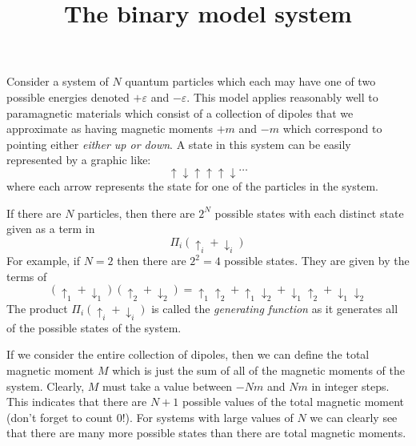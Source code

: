\documentclass{article}
\title{The binary model system}
\begin{document}
\maketitle
Consider a system of $N$ quantum particles which each may have one of two
possible energies denoted $+\varepsilon$ and $-\varepsilon$. This model applies
reasonably well to paramagnetic materials which consist of a collection of
dipoles that we approximate as having magnetic moments $+m$ and $-m$ which
correspond to pointing either \textit{either up or down}. A state in this
system can be easily represented by a graphic like: 
\begin{equation}
  \uparrow \downarrow \uparrow \uparrow \uparrow \downarrow \ldots
\end{equation}
where each arrow represents the state for one of the particles in the system.

If there are $N$ particles, then there are $2^N$ possible states with each
distinct state given as a term in
\begin{equation}
  \Pi_i (\uparrow_i + \downarrow_i)
\end{equation}
For example, if $N=2$ then there are $2^2=4$ possible states. They are given by
the terms of
\begin{equation}
  (\uparrow_1 + \downarrow_1)(\uparrow_2+\downarrow_2) = \uparrow_1\uparrow_2 + \uparrow_1\downarrow_2 + \downarrow_1\uparrow_2 + \downarrow_1\downarrow_2
\end{equation}
The product $\Pi_i(\uparrow_i+\downarrow_i)$ is called the \textit{generating
  function} as it generates all of the possible states of the system.

If we consider the entire collection of dipoles, then we can define the total
magnetic moment $M$ which is just the sum of all of the magnetic moments of the
system. Clearly, $M$ must take a value between $-Nm$ and $Nm$ in integer steps.
This indicates that there are $N+1$ possible values of the total magnetic moment
(don't forget to count 0!). For systems with large values of $N$ we can clearly
see that there are many more possible states than there are total magnetic
moments.
\end{document}
